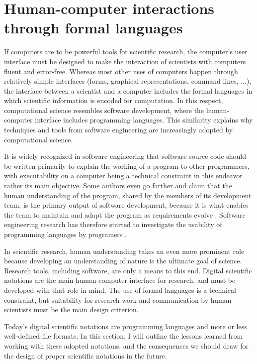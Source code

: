 \section{Human-computer interactions through formal languages}
\label{HCI}

If computers are to be powerful tools for scientific research, the computer's user interface must be designed to make the interaction of scientists with computers fluent and error-free. Whereas most other uses of computers happen through relatively simple interfaces (forms, graphical representations, command lines, ...), the interface between a scientist and a computer includes the formal languages in which scientific information is encoded for computation. In this respect, computational science resembles software development, where the human-computer interface includes programming languages. This similarity explains why techniques and tools from software engineering are increasingly adopted by computational science.

It is widely recognized in software engineering that software source code should be written primarily to explain the working of a program to other programmers, with executability on a computer being a technical constraint in this endeavor rather its main objective. Some authors even go farther and claim that the human understanding of the program, shared by the members of its development team, is the primary output of software development, because it is what enables the team to maintain and adapt the program as requirements evolve \cite{naur_programming_1985}. Software engineering research has therefore started to investigate the usability of programming languages by programers \cite{_plateau_2010}.

In scientific research, human understanding takes an even more prominent role because developing an understanding of nature is the ultimate goal of science. Research tools, including software, are only a means to this end. Digital scientific notations are the main human-computer interface for research, and must be developed with that role in mind. The use of formal languages is a technical constraint, but suitability for research work and communication by human scientists must be the main design criterion.

Today's digital scientific notations are programming languages and more or less well-defined file formats. In this section, I will outline the lessons learned from working with these adopted notations, and the consequences we should draw for the design of proper scientific notations in the future.

